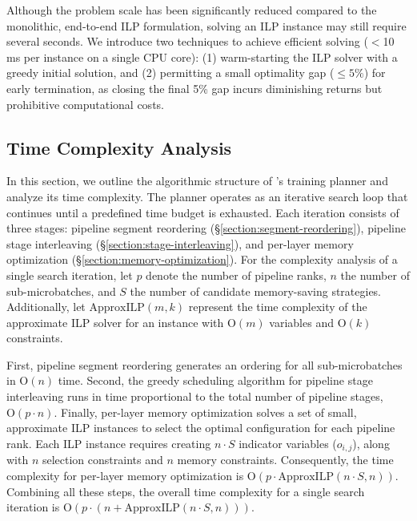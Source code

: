 Although the problem scale has been significantly reduced compared to the monolithic, end-to-end ILP formulation,
solving an ILP instance may still require several seconds.
We introduce two techniques to achieve efficient solving ($<$10 ms per instance on a single CPU core):
(1) warm-starting the ILP solver with a greedy initial solution, and
(2) permitting a small optimality gap (\eg $\leq 5\%$) for early termination,
as closing the final 5\% gap incurs diminishing returns but prohibitive computational costs.

\subsection{Time Complexity Analysis}

In this section, we outline the algorithmic structure of {\sys}'s training planner and
analyze its time complexity.
The planner operates as an iterative search loop that continues until a predefined time budget is exhausted.
Each iteration consists of three stages:
pipeline segment reordering (\S\ref{section:segment-reordering}),
pipeline stage interleaving (\S\ref{section:stage-interleaving}), and
per-layer memory optimization (\S\ref{section:memory-optimization}).
For the complexity analysis of a single search iteration, let
$p$ denote the number of pipeline ranks,
$n$ the number of sub-microbatches, and
$S$ the number of candidate memory-saving strategies.
Additionally, let $\mathrm{ApproxILP}(m, k)$ represent the time complexity of the approximate ILP solver for
an instance with $\mathrm O(m)$ variables and $\mathrm O(k)$ constraints.

First, pipeline segment reordering generates an ordering for all sub-microbatches in $\mathrm O(n)$ time.
Second, the greedy scheduling algorithm for pipeline stage interleaving runs in time proportional to the total number of pipeline stages, \ie $\mathrm O(p \cdot n)$.
Finally, per-layer memory optimization solves a set of small, approximate ILP instances to select the optimal configuration for each pipeline rank.
Each ILP instance requires creating $n \cdot S$ indicator variables ($o_{i,j}$),
along with $n$ selection constraints and $n$ memory constraints.
Consequently, the time complexity for per-layer memory optimization is $\mathrm O(p \cdot \mathrm{ApproxILP}(n \cdot S, n))$.
Combining all these steps, the overall time complexity for a single search iteration is $\mathrm O(p \cdot (n + \mathrm{ApproxILP}(n \cdot S, n)))$.

